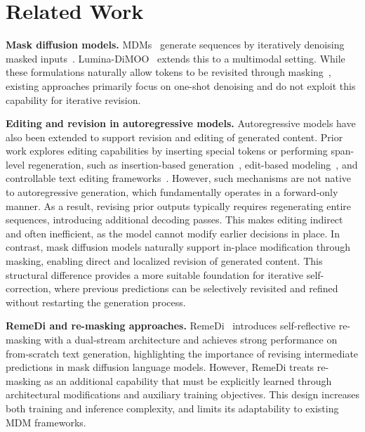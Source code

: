 \documentclass{llmxive}
\begin{document}
\section{Related Work}
\label{sec:related-work}

\textbf{Mask diffusion models.}
MDMs~\citep{nie2025large,ye2025dream,lou2023discrete} generate sequences by iteratively denoising masked inputs~\citep{ghazvininejad2019mask,chang2022maskgit,li2022diffusion,gong2024scaling}. Lumina-DiMOO~\citep{xin2025lumina} extends this to a multimodal setting. While these formulations naturally allow tokens to be revisited through masking~\citep{gong2025diffucoder,xie2025dream}, existing approaches primarily focus on one-shot denoising and do not exploit this capability for iterative revision.

\textbf{Editing and revision in autoregressive models.}
Autoregressive models have also been extended to support revision and editing of generated content. Prior work explores editing capabilities by inserting special tokens or performing span-level regeneration, such as insertion-based generation~\citep{stern2019insertion,gu2019levenshtein}, edit-based modeling~\citep{guu2018generating}, and controllable text editing frameworks~\citep{malmi2019encode,mallinson2020felix,mallinson2022edit5,faltings2021text}. However, such mechanisms are not native to autoregressive generation, which fundamentally operates in a forward-only manner. As a result, revising prior outputs typically requires regenerating entire sequences, introducing additional decoding passes. This makes editing indirect and often inefficient, as the model cannot modify earlier decisions in place. In contrast, mask diffusion models naturally support in-place modification through masking, enabling direct and localized revision of generated content. This structural difference provides a more suitable foundation for iterative self-correction, where previous predictions can be selectively revisited and refined without restarting the generation process.

\textbf{RemeDi and re-masking approaches.}
RemeDi~\citep{huang2025don} introduces self-reflective re-masking with a dual-stream architecture and achieves strong performance on from-scratch text generation, highlighting the importance of revising intermediate predictions in mask diffusion language models. However, RemeDi treats re-masking as an additional capability that must be explicitly learned through architectural modifications and auxiliary training objectives. This design increases both training and inference complexity, and limits its adaptability to existing MDM frameworks.
\end{document}
